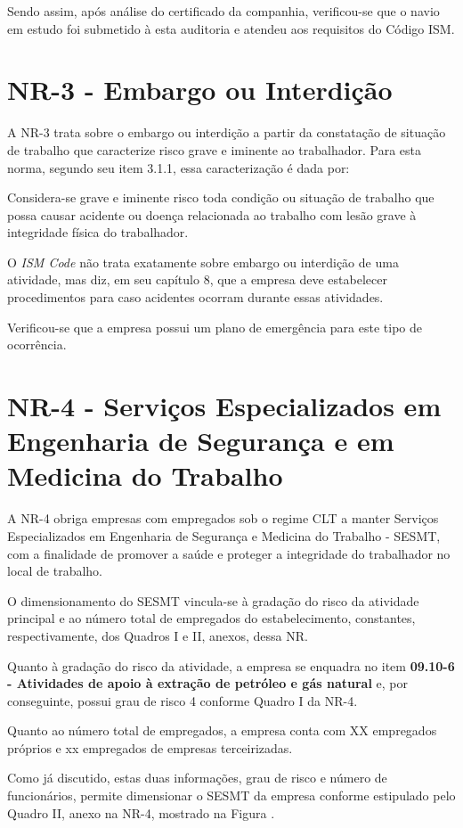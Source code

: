 \documentclass[../main.tex]{subfiles}
\begin{document}
Sendo assim, após análise do certificado da companhia, verificou-se que o navio em estudo foi submetido à esta auditoria e atendeu aos requisitos do Código ISM.

\section{NR-3 - Embargo ou Interdição}
A NR-3 trata sobre o embargo ou interdição a partir da constatação de situação de trabalho que caracterize risco grave e iminente ao trabalhador. Para esta norma, segundo seu item 3.1.1, essa caracterização é dada por:

\begin{citacao}
Considera-se grave e iminente risco toda condição ou situação de trabalho que possa causar acidente ou doença relacionada ao trabalho com lesão grave à integridade física do trabalhador.
\end{citacao}

O \emph{ISM Code} não trata exatamente sobre embargo ou interdição de uma atividade, mas diz, em seu capítulo 8, que a empresa deve estabelecer procedimentos para caso acidentes ocorram durante essas atividades.

Verificou-se que a empresa possui um plano de emergência para este tipo de ocorrência.

\section{NR-4 - Serviços Especializados em Engenharia de Segurança e em Medicina do Trabalho}
 A NR-4 obriga empresas com empregados sob o regime CLT a manter Serviços Especializados em Engenharia de Segurança e Medicina do Trabalho - SESMT, com a finalidade de promover a saúde e proteger a integridade do trabalhador no local de trabalho.
 
 O dimensionamento do SESMT vincula-se à gradação do risco da atividade principal e ao número total de empregados do estabelecimento, constantes, respectivamente, dos Quadros I e II, anexos, dessa NR.
 
 Quanto à gradação do risco da atividade, a empresa se enquadra no item \textbf{09.10-6 - Atividades de apoio à extração de petróleo e gás natural} e, por conseguinte, possui grau de risco 4 conforme Quadro I da NR-4.
 
 Quanto ao número total de empregados, a empresa conta com XX empregados próprios e xx empregados de empresas terceirizadas.
 
 Como já discutido, estas duas informações, grau de risco e número de funcionários, permite dimensionar o SESMT da empresa conforme estipulado pelo Quadro II, anexo na NR-4, mostrado na Figura .
\end{document}
